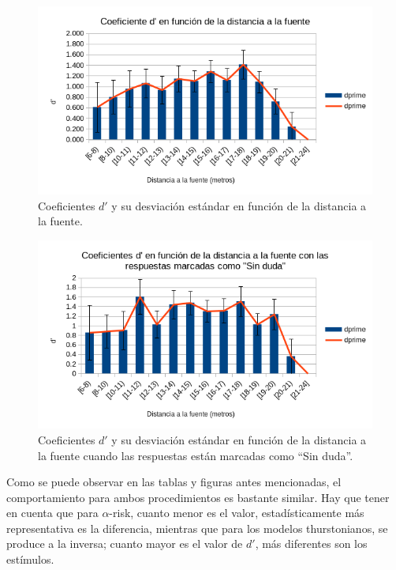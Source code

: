 \documentclass[11pt,a4paper]{book}
\begin{document}
		    \begin{figure}[H]
                \includegraphics[scale=0.7]{../imagenes/analisisThurstFuenteDuda.png}
			    \centering
			    \caption{Coeficientes $d'$ y su desviación estándar en función de la distancia a la fuente.} 
			    \label{fig:ThurstFuenteDuda}
            \end{figure}
            
            \begin{figure}[H]
                \includegraphics[scale=0.7]{../imagenes/analisisThurstFuenteSinDuda.png}
			    \centering
			    \caption{Coeficientes $d'$ y su desviación estándar en función de la distancia a la fuente cuando las respuestas están marcadas como ``Sin duda''.} 
			    \label{fig:ThurstFuenteSinDuda}
            \end{figure}

            Como se puede observar en las tablas y figuras antes mencionadas, el comportamiento para ambos procedimientos es bastante similar. Hay que tener en cuenta que para $\alpha$-risk, cuanto menor es el valor, estadísticamente más representativa es la diferencia, mientras que para los modelos thurstonianos, se produce a la inversa; cuanto mayor es el valor de $d'$, más diferentes son los estímulos.
            
\end{document}
